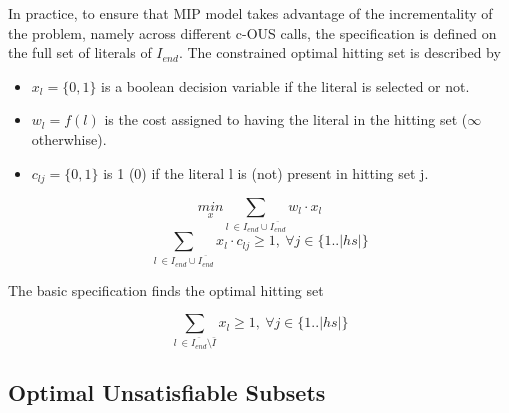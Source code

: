 \documentclass{article}
\newcommand\Iend{\ensuremath{I_\mathit{end} }\xspace}
\begin{document}
In practice, to ensure that MIP model takes advantage of the incrementality of the problem, namely across different c-OUS calls, the specification is defined on the full set of literals of $\Iend$.
The constrained optimal hitting set is described by
\begin{itemize}
  \item $x_l = \{0, 1\} $ is a boolean decision variable if the literal is selected or not.
  \item $w_l = f(l)$ is the cost assigned to having the literal in the hitting set ($\infty$ otherwhise).
  \item $c_{lj} = \{0, 1\}$ is 1 (0) if the literal l is (not) present in hitting set j.
\end{itemize}

\begin{equation} \label{eq:ILP:objective}
  \underset{x}{min} \sum_{ l\  \in  \Iend \cup \overline{\Iend}} w_l \cdot x_l
\end{equation}
\begin{equation} \label{eq:ILP:hittingset}
  \sum_{ l\  \in  \Iend \cup \overline{\Iend}} x_l \cdot c_{lj} \geq 1, \  \forall j \in \{1..|hs|\}
\end{equation}

The basic specification finds the optimal hitting set 


\begin{equation} \label{eq:ILP:hittingset}
  \sum_{ l\  \in \overline{\Iend} \setminus \bar{I}} x_l \geq 1, \  \forall j \in \{1..|hs|\}
\end{equation}


\subsection{Optimal Unsatisfiable Subsets}
\end{document}
